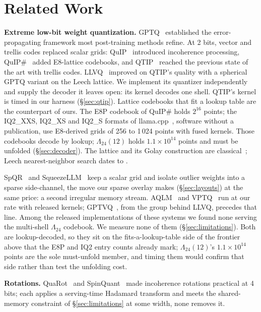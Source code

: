 \section{Related Work}
\label{sec:related}

\textbf{Extreme low-bit weight quantization.} GPTQ~\citep{gptq2023}
established the error-propagating framework most post-training methods
refine. At 2 bits, vector and trellis codes replaced scalar grids:
QuIP~\citep{quip2023} introduced incoherence processing,
QuIP\#~\citep{quipsharp2024} added E8-lattice codebooks, and
QTIP~\citep{qtip2024} reached the previous state of the art with trellis
codes. LLVQ~\citep{llvq2026} improved on QTIP's quality with a spherical GPTQ
variant on the Leech lattice. We implement its quantizer independently and
supply the decoder it leaves open: its kernel decodes one shell. QTIP's
kernel is timed in our harness (\S\ref{sec:qtip}). Lattice codebooks that
fit a lookup table are the counterpart of ours. The E8P codebook of QuIP\#
holds $2^{16}$ points; the IQ2\_XXS, IQ2\_XS and IQ2\_S formats of
llama.cpp~\citep{llamacpp}, software without a publication, use E8-derived
grids of 256 to 1\,024 points with fused kernels. Those codebooks decode by
lookup; $\Lambda_{24}(12)$ holds $1.1 \times 10^{14}$ points and must be
unfolded (\S\ref{sec:decoder}). The lattice and its Golay construction are
classical~\citep{conway1999sphere,cohn2017}; Leech nearest-neighbor search
dates to \citet{adoul1988}.

SpQR~\citep{spqr2023} and SqueezeLLM~\citep{squeezellm2024} keep a scalar
grid and isolate outlier weights into a sparse side-channel, the move our
sparse overlay makes (\S\ref{sec:layouts}) at the same price: a second
irregular memory stream. AQLM~\citep{aqlm2024} and VPTQ~\citep{vptq2024} run
at our rate with released kernels; GPTVQ~\citep{gptvq2024}, from the group
behind LLVQ, precedes that line. Among the released implementations of
these systems we found none serving the multi-shell $\Lambda_{24}$
codebook. We measure none of them
(\S\ref{sec:limitations}). Both are lookup-decoded, so they sit on the
fits-a-lookup-table side of the frontier above that the E8P and IQ2 entry
counts already mark; $\Lambda_{24}(12)$'s $1.1\times10^{14}$ points are the
sole must-unfold member, and timing them would confirm that side rather than
test the unfolding cost.

\textbf{Rotations.} QuaRot~\citep{quarot2024} and SpinQuant~\citep{spinquant2024}
made incoherence rotations practical at 4 bits; each applies a serving-time
Hadamard transform and meets the shared-memory constraint of
\S\ref{sec:limitations} at some width, none removes it.

